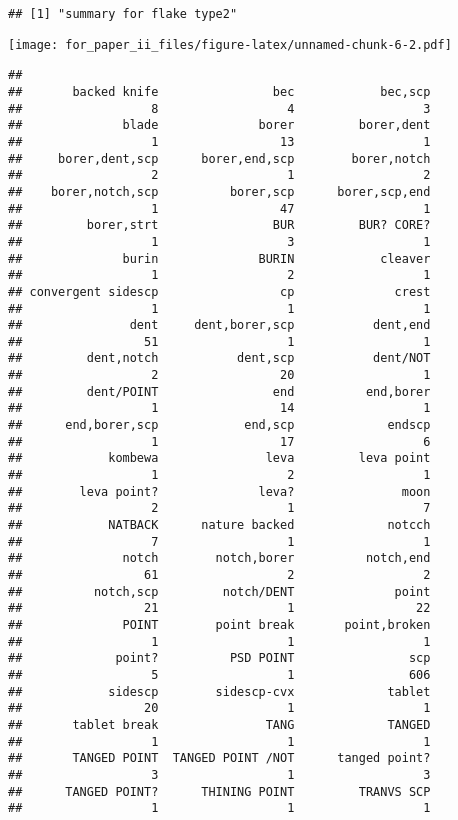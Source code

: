 \documentclass[]{article}
\begin{document}
\begin{verbatim}
## [1] "summary for flake type2"
\end{verbatim}

\texttt{[image: for\_paper\_ii\_files/figure-latex/unnamed-chunk-6-2.pdf]}

\begin{verbatim}
## 
##       backed knife                bec            bec,scp 
##                  8                  4                  3 
##              blade              borer         borer,dent 
##                  1                 13                  1 
##     borer,dent,scp      borer,end,scp        borer,notch 
##                  2                  1                  2 
##    borer,notch,scp          borer,scp      borer,scp,end 
##                  1                 47                  1 
##         borer,strt                BUR         BUR? CORE? 
##                  1                  3                  1 
##              burin              BURIN            cleaver 
##                  1                  2                  1 
## convergent sidescp                 cp              crest 
##                  1                  1                  1 
##               dent     dent,borer,scp           dent,end 
##                 51                  1                  1 
##         dent,notch           dent,scp           dent/NOT 
##                  2                 20                  1 
##         dent/POINT                end          end,borer 
##                  1                 14                  1 
##      end,borer,scp            end,scp             endscp 
##                  1                 17                  6 
##            kombewa               leva         leva point 
##                  1                  2                  1 
##        leva point?              leva?               moon 
##                  2                  1                  7 
##            NATBACK      nature backed             notcch 
##                  7                  1                  1 
##              notch        notch,borer          notch,end 
##                 61                  2                  2 
##          notch,scp         notch/DENT              point 
##                 21                  1                 22 
##              POINT        point break       point,broken 
##                  1                  1                  1 
##             point?          PSD POINT                scp 
##                  5                  1                606 
##            sidescp        sidescp-cvx             tablet 
##                 20                  1                  1 
##       tablet break               TANG             TANGED 
##                  1                  1                  1 
##       TANGED POINT  TANGED POINT /NOT      tanged point? 
##                  3                  1                  3 
##      TANGED POINT?      THINING POINT         TRANVS SCP 
##                  1                  1                  1
\end{verbatim}
\end{document}
